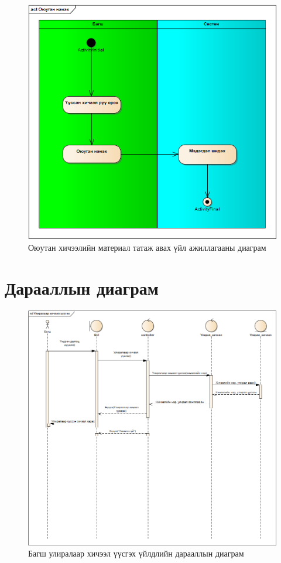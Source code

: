 \newpage
\begin{figure}
	\centering
	\includegraphics[angle=90, scale=0.8]{Diagrams/activity3}
	\caption[Оюутан хичээлийн материал татаж авах үйл ажиллагааны диаграм]{Оюутан хичээлийн материал татаж авах үйл ажиллагааны диаграм}
	\label{text}
\end{figure}

\newpage
\section{Дарааллын диаграм}
\newpage
\begin{figure}
	\centering
	\includegraphics[angle=90, scale=0.5]{Diagrams/Sequence1}
	\caption[Багш улиралаар хичээл үүсгэх үйлдлийн дарааллын диаграм]{Багш улиралаар хичээл үүсгэх үйлдлийн дарааллын диаграм}
	\label{text}
\end{figure}

